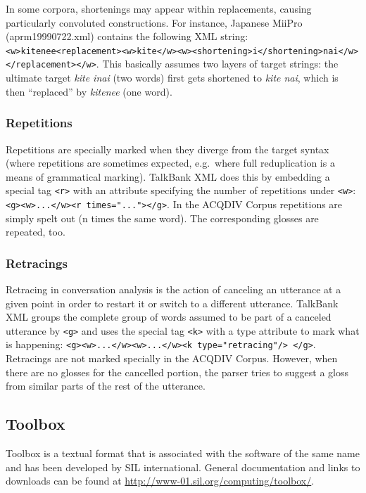 \documentclass[a4paper, 11pt]{book}
\begin{document}
In some corpora, shortenings may appear within replacements, causing particularly convoluted constructions. For instance, Japanese MiiPro (aprm19990722.xml) contains the following XML string: \texttt{<w>kitenee<replacement><w>kite</w><w><shortening>i</shortening>nai</w>\\</replacement></w>}. This basically assumes two layers of target strings: the ultimate target \emph{kite inai} (two words) first gets shortened to \emph{kite nai}, which is then “replaced” by \emph{kitenee} (one word).

\subsubsection*{Repetitions}

Repetitions are specially marked when they diverge from the target syntax (where repetitions are sometimes expected, e.g.\ where full reduplication is a means of grammatical marking). TalkBank XML does this by embedding a special tag \texttt{<r>} with an attribute specifying the number of repetitions under \texttt{<w>}: \texttt{<g><w>...</w><r times="..."></g>}. In the ACQDIV Corpus repetitions are simply spelt out (n times the same word). The corresponding glosses are repeated, too.

\subsubsection*{Retracings}

Retracing in conversation analysis is the action of canceling an utterance at a given point in order to restart it or switch to a different utterance. TalkBank XML groups the complete group of words assumed to be part of a canceled utterance by \texttt{<g>} and uses the special tag \texttt{<k>} with a type attribute to mark what is happening: \texttt{<g><w>...</w><w>...</w><k type="retracing"/> </g>}. Retracings are not marked specially in the ACQDIV Corpus. However, when there are no glosses for the cancelled portion, the parser tries to suggest a gloss from similar parts of the rest of the utterance.


\subsection{Toolbox}
\label{subsec:Toolbox}

Toolbox is a textual format that is associated with the software of the same name and has been developed by SIL international. General documentation and links to downloads can be found at \url{http://www-01.sil.org/computing/toolbox/}. 
\end{document}
